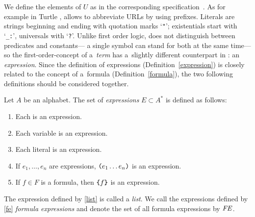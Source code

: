 We define the elements of $U$ as in the corresponding specification~\cite{iri}. As for example in Turtle \cite{turtle},
\nthree allows  to abbreviate URLs by using prefixes.
Literals are strings beginning and ending with quotation marks `\verb!"!';
existentials start with `\verb!_:!', universals with `\verb!?!'.
%
Unlike first order logic, \nthree does not distinguish between predicates and constants---%
a single \uri symbol can stand for both at the same time---%
so the first-order-concept of a~\emph{term}
has a~slightly different counterpart in \nthree: an \emph{expression}.
Since the definition of expressions (Definition~\ref{expression})
is closely related to the concept of a~formula (Definition~\ref{formula}),
the two following definitions should be considered together.



\begin{definition}[Expressions]\label{expression}
  Let $A$ be an \nthree alphabet.
  The set of \textit{expressions} $E \subset A^{*}$ is
  defined as follows:
  \begin{enumerate}
    \item Each \uri is an expression.
    \item Each variable is an expression.
    \item Each literal is an expression.
    \item \label{list} If $e_1,\ldots,e_n$ are expressions, $\verb!(!e_1 \ldots e_n\verb!)!$ is an expression. 
    \item \label{fe} If $f\in F$ is a formula, then $\verb!{!f\verb!}!$ is an expression. 
  \end{enumerate}
  The expression defined by \ref{list} is called a \textit{list}.
  We call the expressions defined by %
  \ref{fe}
  \textit{formula expressions} and denote the set of all formula expressions by $\mbox{\textit{FE}}$.
\end{definition}


